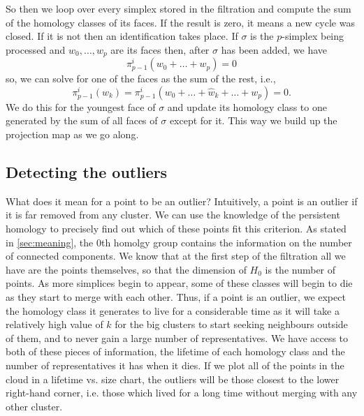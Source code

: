 \documentclass[../main.tex]{subfiles}
\begin{document}
So then we loop over every simplex stored in the filtration and compute the sum of the
homology classes of its faces. If the result is zero, it means a new cycle was closed. If
it is not then an identification takes place. If \( \sigma \) is the \( p \)-simplex being
processed and \( w_0, \dots, w_p \) are its faces then, after \( \sigma \) has been added,
we have
\begin{equation*}
	\pi_{p-1}^i(w_0 + \dots + w_p) = 0
\end{equation*}
so, we can solve for one of the faces as the sum of the rest, i.e.,
\begin{equation*}
	\pi_{p-1}^i(w_k) = \pi_{p-1}^i(w_0 + \dots + \hat{w}_k + \dots + w_p) = 0.
\end{equation*}
We do this for the youngest face of \( \sigma \) and update its homology class to one
generated by the sum of all faces of \( \sigma \) except for it. This way we build up the
projection map as we go along. 

\subsection{Detecting the outliers}
What does it mean for a point to be an outlier? Intuitively, a point is an outlier if it
is far removed from any cluster. We can use the knowledge of the persistent homology to
precisely find out which of these points fit this criterion. As stated in
\cref{sec:meaning}, the 0th homolgy group contains the information on the number of
connected components. We know that at the first step of the filtration all we have are the
points themselves, so that the dimension of \( H_0 \) is the number of points. As more
simplices begin to appear, some of these classes will begin to die as they start to merge
with each other. Thus, if a point is an outlier, we expect the homology class it generates
to live for a considerable time as it will take a relatively high value of \( k \) for the
big clusters to start seeking neighbours outside of them, and to never gain a large number
of representatives. We have access to both of these pieces of information, the lifetime of
each homology class and the number of representatives it has when it dies. If we plot all
of the points in the cloud in a lifetime vs. size chart, the outliers will be those
closest to the lower right-hand corner, i.e. those which lived for a long time without
merging with any other cluster. 
\end{document}
